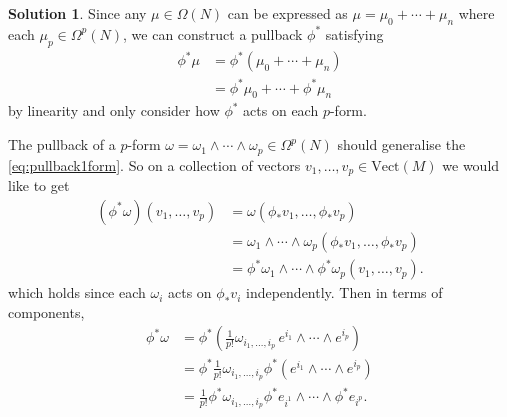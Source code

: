\documentclass[11pt, a4paper]{report}
\theoremstyle{definition}
\newtheorem{sol}{Solution}[part]
\begin{document}
\begin{sol}

Since any $\mu \in \Omega(N)$ can be expressed as $\mu = \mu_0 + \cdots + \mu_n$ where each $\mu_p \in \Omega^p(N)$, we can construct a pullback $\phi^*$ satisfying
\begin{align*}
    \phi^* \mu &= \phi^* (\mu_0 + \cdots + \mu_n) \\
               &= \phi^* \mu_0 + \cdots + \phi^* \mu_n
\end{align*}
by linearity and only consider how $\phi^*$ acts on each $p$-form.

The pullback of a $p$-form $\omega = \omega_1 \wedge \cdots \wedge \omega_p \in \Omega^p(N)$ should generalise the \ref{eq:pullback1form}.  %
So on a collection of vectors $v_1, \ldots, v_p \in \text{Vect}(M)$ we would like to get
\begin{align*}
    (\phi^* \omega)(v_1, \ldots, v_p) &= \omega(\phi_* v_1, \ldots, \phi_* v_p) \\
        &=\omega_1 \wedge \cdots \wedge \omega_p (\phi_* v_1, \ldots, \phi_* v_p) \\
        &= \phi^* \omega_1 \wedge \cdots \wedge \phi^* \omega_p (v_1, \ldots, v_p).
\end{align*}
which holds since each $\omega_i$ acts on $\phi_* v_i$ independently. Then in terms of components,
\begin{align*}
    \phi^* \omega &= \phi^* \left( \tfrac{1}{p!} \omega_{i_1,\ldots,i_p}\, e^{i_1} \wedge \cdots \wedge e^{i_p} \right) \\
        &= \phi^* \tfrac{1}{p!} \omega_{i_1,\ldots,i_p} \phi^* (e^{i_1} \wedge \cdots \wedge e^{i_p}) \\
        &= \tfrac{1}{p!} \phi^* \omega_{i_1,\ldots,i_p} \phi^* e_{i^1} \wedge \cdots \wedge \phi^* e_{i^p}.
\end{align*}


\end{sol}
\end{document}
